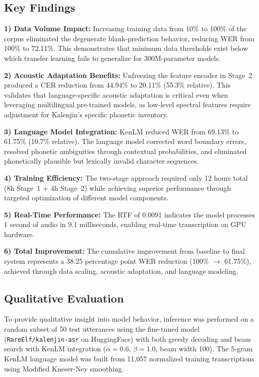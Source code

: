 \documentclass[conference]{IEEEtran}
\begin{document}
\subsection{Key Findings}

\textbf{1) Data Volume Impact:} Increasing training data from 10\% to 100\% of the corpus eliminated the degenerate blank-prediction behavior, reducing WER from 100\% to 72.11\%. This demonstrates that minimum data thresholds exist below which transfer learning fails to generalize for 300M-parameter models.

\textbf{2) Acoustic Adaptation Benefits:} Unfreezing the feature encoder in Stage~2 produced a CER reduction from 44.94\% to 20.11\% (55.3\% relative). This validates that language-specific acoustic adaptation is critical even when leveraging multilingual pre-trained models, as low-level spectral features require adjustment for Kalenjin's specific phonetic inventory.

\textbf{3) Language Model Integration:} KenLM reduced WER from 69.13\% to 61.75\% (10.7\% relative). The language model corrected word boundary errors, resolved phonetic ambiguities through contextual probabilities, and eliminated phonetically plausible but lexically invalid character sequences.

\textbf{4) Training Efficiency:} The two-stage approach required only 12 hours total (8h Stage~1 + 4h Stage~2) while achieving superior performance through targeted optimization of different model components.

\textbf{5) Real-Time Performance:} The RTF of 0.0091 indicates the model processes 1 second of audio in 9.1 milliseconds, enabling real-time transcription on GPU hardware.

\textbf{6) Total Improvement:} The cumulative improvement from baseline to final system represents a 38.25 percentage point WER reduction (100\% $\rightarrow$ 61.75\%), achieved through data scaling, acoustic adaptation, and language modeling.

\subsection{Qualitative Evaluation}

To provide qualitative insight into model behavior, inference was performed on a random subset of 50 test utterances using the fine-tuned model (\texttt{RareElf/kalenjin-asr} on HuggingFace) with both greedy decoding and beam search with KenLM integration ($\alpha = 0.6$, $\beta = 1.0$, beam width 100). The 5-gram KenLM language model was built from 11,057 normalized training transcriptions using Modified Kneser-Ney smoothing.
\end{document}
